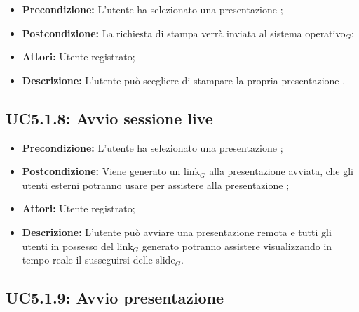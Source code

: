 \begin{itemize}
	\item \textbf{Precondizione:} L'utente ha selezionato una presentazione ;
	\item \textbf{Postcondizione:} La richiesta di stampa verrà inviata al sistema operativo$_G$;
	\item \textbf{Attori:} Utente registrato;
	\item \textbf{Descrizione:} L'utente può scegliere di stampare la propria presentazione .
\end{itemize}
\subsection{ UC5.1.8: Avvio sessione live}

\begin{itemize}
	\item \textbf{Precondizione:} L'utente ha selezionato una presentazione ;
	\item \textbf{Postcondizione:} Viene generato un link$_G$ alla presentazione avviata, che gli utenti esterni potranno usare per assistere alla presentazione ;
	\item \textbf{Attori:} Utente registrato;
	\item \textbf{Descrizione:} L'utente può avviare una presentazione remota e tutti gli utenti in possesso del link$_G$ generato potranno assistere visualizzando in tempo reale il susseguirsi delle slide$_G$.
\end{itemize}
\subsection{ UC5.1.9: Avvio presentazione }

